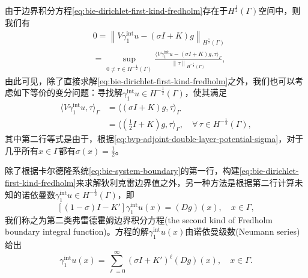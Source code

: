 由于边界积分方程\eqref{eq:bie-dirichlet-first-kind-fredholm}存在于$H^{\frac{1}{2}}(\Gamma)$空间中，则我们有
\begin{equation*}
  \begin{split}
    & 0 = \left\| V \gamma_{1}^{\text{int}} u - \left( \sigma I + K \right) g \right\|_{H^{\frac{1}{2}}(\Gamma)} \\
    & = \sup_{0 \neq \tau \in H^{-\frac{1}{2}}(\Gamma)}
    \frac{
    \langle
    V \gamma_{1}^{\text{int}} u - \left( \sigma I + K \right) g, \tau
    \rangle_{\Gamma}
    }{
    \left\| \tau \right\|_{H^{-\frac{1}{2}}(\Gamma)}
    },
  \end{split}
\end{equation*}
由此可见，除了直接求解\eqref{eq:bie-dirichlet-first-kind-fredholm}之外，我们也可以考虑如下等价的变分问题：寻找解$\gamma_{1}^{\text{int}} u \in H^{-\frac{1}{2}}(\Gamma)$，使其满足
\begin{equation}
  \begin{split}
  \label{eq:bie-dirichlet-direct-variational}
  \langle V \gamma_{1}^{\text{int}} u, \tau \rangle_{\Gamma}
  & = \langle \left( \sigma I + K \right) g, \tau \rangle_{\Gamma} \\
  & = \langle \left( \frac{1}{2} I + K \right) g, \tau \rangle_{\Gamma}, \quad \forall \, \tau \in H^{-\frac{1}{2}}(\Gamma),
\end{split}
\end{equation}
其中第二行等式是由于，根据\eqref{eq:bvp-adjoint-double-layer-potential-sigma}，对于几乎所有$x \in \Gamma$都有$\sigma(x) = \frac{1}{2}$。

除了根据卡尔德隆系统\eqref{eq:bie-system-boundary}的第一行，构建\eqref{eq:bie-dirichlet-first-kind-fredholm}来求解狄利克雷边界值之外，另一种方法是根据第二行计算未知的诺依曼数$\gamma_{1}^{\text{int}} u \in H^{-\frac{1}{2}}(\Gamma)$，即
\begin{equation}
  \label{eq:bie-dirichlet-second-kind-fredholm}
  \left[
  \left( 1 - \sigma \right)I - K'
  \right]
  \gamma_{1}^{\text{int}} u(x)
  = \left( D g \right)(x), \quad x \in \Gamma,
\end{equation}
我们称之为第二类弗雷德霍姆边界积分方程(the second kind of Fredholm boundary integral function)\citep{Atkinson:1996vm, Atkinson:1997vx}。方程的解$\gamma_{1}^{\text{int}}u(x)$由诺依曼级数(Neumann series)给出
\begin{equation}
  \label{eq:bie-dirichlet-neumann-series}
  \gamma_{1}^{\text{int}} u(x) = \sum_{\ell = 0}^{\infty}
  \left( \sigma I + K' \right)^{\ell}
  \left( D g \right)(x), \quad x \in \Gamma.
\end{equation}

